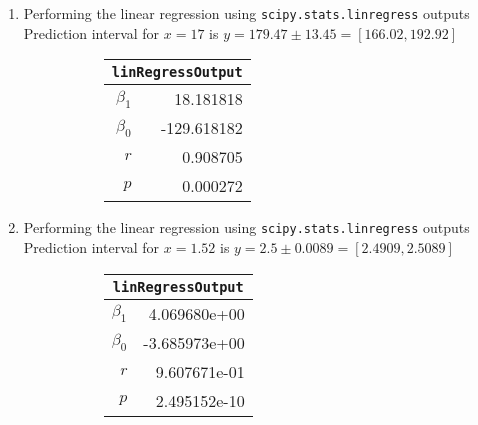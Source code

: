 \begin{enumerate}
\item Performing the linear regression using \texttt{scipy.stats.linregress} outputs \\
Prediction interval for $ x = 17 $ is $ y = 179.47 \pm 13.45 = [166.02, 192.92] $\\


\begin{figure}[H]
	\begin{subfigure}[]{0.2\linewidth}
		\centering
		\begin{tabular}{@{}rr@{}}
			\toprule
			\multicolumn{2}{c}{\texttt{linRegressOutput}} \\
			\midrule
			$\beta_1$     &        18.181818 \\
			$\beta_0$ &      -129.618182 \\
			$r$    &         0.908705 \\
			$p$    &         0.000272 \\
			\bottomrule
		\end{tabular}
		
	\end{subfigure}
	\begin{subfigure}[]{0.8\linewidth}
		\centering
		
	\end{subfigure}
\end{figure}

\item Performing the linear regression using \texttt{scipy.stats.linregress} outputs \\
Prediction interval for $ x = 1.52 $ is $ y = 2.5 \pm 0.0089 = [2.4909, 2.5089] $\\

\begin{figure}[H]
	\begin{subfigure}[]{0.2\linewidth}
		\centering
		\begin{tabular}{@{}rr@{}}
			\toprule
			\multicolumn{2}{c}{\texttt{linRegressOutput}} \\
			\midrule
			$\beta_1$     &     4.069680e+00 \\
			$\beta_0$ &    -3.685973e+00 \\
			$r$    &     9.607671e-01 \\
			$p$    &     2.495152e-10 \\
			\bottomrule
		\end{tabular}
		

\end{subfigure}
\end{figure}
\end{enumerate}
